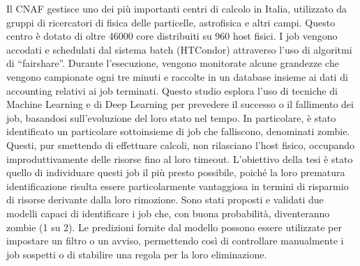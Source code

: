Il CNAF gestisce uno dei più importanti centri di calcolo in Italia,
utilizzato da gruppi di ricercatori di fisica delle particelle, astrofisica e
altri campi.
Questo centro è dotato di oltre 46000 core distribuiti su 960 host fisici. I
job vengono accodati e schedulati dal sistema batch (HTCondor) attraverso
l'uso di algoritmi di ``fairshare''.
Durante l'esecuzione, vengono monitorate alcune grandezze che vengono
campionate ogni tre minuti e raccolte in un database insieme ai dati di
accounting relativi ai job terminati.
Questo studio esplora l'uso di tecniche di Machine Learning e di Deep Learning
per prevedere il successo o il fallimento dei job, basandosi sull'evoluzione
del loro stato nel tempo.
In particolare, è stato identificato un particolare sottoinsieme di job che
falliscono, denominati zombie. Questi, pur smettendo di effettuare calcoli,
non rilasciano l'host fisico, occupando improduttivamente delle risorse fino
al loro timeout.
L'obiettivo della tesi è stato quello di individuare questi job il più presto
possibile, poiché la loro prematura identificazione risulta essere
particolarmente vantaggiosa in termini di risparmio di risorse derivante dalla
loro rimozione.
Sono stati proposti e validati due modelli capaci di identificare i job che,
con buona probabilità, diventeranno zombie (1 su 2). Le predizioni fornite dal
modello possono essere utilizzate per impostare un filtro o un avviso,
permettendo così di controllare manualmente i job sospetti o di stabilire una
regola per la loro eliminazione.
